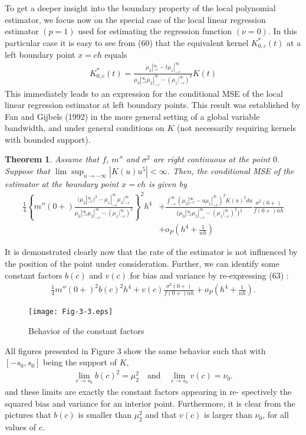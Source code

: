 \documentclass[12pt]{article}
\renewcommand{\=}[1]{\stackrel{#1}{=}} %
\newtheorem{thm}{Theorem}[section]
\theoremstyle{definition}
\begin{document}
	To get a deeper insight into the boundary property of the local polynomial estimator, we focus now on the special case of the local linear regression estimator $(p=1)$ used for estimating the regression function $(\nu=0)$. In this particular case it is easy to see from (60) that the equivalent kernel $K^*_{0,c}(t)$ at a left boundary point $x=ch$ equals
	\begin{align}
	K^*_{0,c}(t)=\frac{\mu_{2}|_{-c}^{\infty}-t\mu_{1}|_{-c}^{\infty}}{\mu_{0}|_{-c}^{\infty}\mu_{2}|_{-c}^{\infty}-(\mu_{1}|_{-c}^{\infty})^2}K(t)
	\end{align}
	This immediately leads to an expression for the conditional MSE of the local linear regression estimator at left boundary points. This result was established by Fan and Gijbels (1992) in the more general setting of a global variable bandwidth, and under general conditions on $K$ (not necessarily requiring kernels with bounded support).
	\begin{thm}
		Assume that $f$, $m''$ and $\sigma^2$ are right continuous at the point $0$. Suppose that $\lim\sup_{u\rightarrow-\infty}|K(u)u^5|<\infty$. Then, the conditional MSE of the estimator at the boundary point $x=ch$ is given by 
		\begin{align}
		\frac{1}{4}\left\{m''(0+)\frac{(\mu_{2}|_{-c}^{\infty})^2-\mu_{1}|_{-c}^{\infty}\mu_{3}|_{-c}^{\infty}}{\mu_{0}|_{-c}^{\infty}\mu_{2}|_{-c}^{\infty}-(\mu_{1}|_{-c}^{\infty})^2}\right\}^2h^4&+\frac{\int_{-c}^{\infty}(\mu_{2}|_{-c}^{\infty}-u\mu_{1}|_{-c}^{\infty})^2K(u)^2du}{\{\mu_{0}|_{-c}^{\infty}\mu_{2}|_{-c}^{\infty}-(\mu_{1}|_{-c}^{\infty})^2\}^2}\frac{\sigma^2(0+)}{f(0+)nh}\\
		\nonumber&+o_P\left(h^4+\frac{1}{nh}\right)
		\end{align}
	\end{thm}
	It is demonstrated clearly now that the rate of the estimator is not influenced by the position of the point under consideration. Further, we can identify some constant factors $b(c)$ and $v(c)$ for bias and variance by re-expressing (63) :
	\begin{align}
	\frac{1}{4}m''(0+)^2b(c)^2h^4+v(c)\frac{\sigma^2(0+)}{f(0+)nh}+o_P\left(h^4+\frac{1}{nh}\right).
	\end{align}
	\begin{figure}
	\caption{Behavior of the constant factors}
	\centering
	\texttt{[image: Fig-3-3.eps]}	
	\end{figure}
	
	All figures presented in Figure 3 show the same behavior such that with $[-s_0,s_0]$ being the support of $K$,
	\begin{align}
	\underset{c\rightarrow s_0}{\lim}b(c)^2=\mu_2^2\quad\textrm{and}\quad\underset{c\rightarrow s_0}{\lim}v(c)=\nu_0.
	\end{align}
	and these limits are exactly the constant factors appearing in re- spectively the squared bias and variance for an interior point. Furthermore, it is clear from the pictures that $b(c)$ is smaller than $\mu_2^2$ and that $v(c)$ is larger than $\nu_0$, for all values of $c$. 
	
\end{document}
